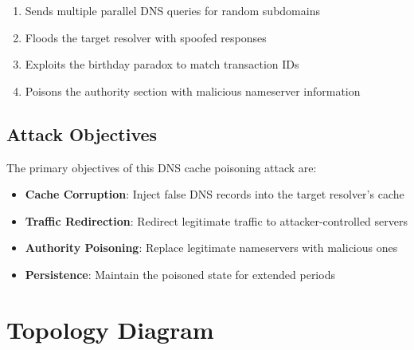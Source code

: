 \documentclass[12pt,a4paper]{article}
\begin{document}
\begin{enumerate}
    \item Sends multiple parallel DNS queries for random subdomains
    \item Floods the target resolver with spoofed responses
    \item Exploits the birthday paradox to match transaction IDs
    \item Poisons the authority section with malicious nameserver information
\end{enumerate}

\subsection{Attack Objectives}

The primary objectives of this DNS cache poisoning attack are:

\begin{itemize}
    \item \textbf{Cache Corruption}: Inject false DNS records into the target resolver's cache
    \item \textbf{Traffic Redirection}: Redirect legitimate traffic to attacker-controlled servers
    \item \textbf{Authority Poisoning}: Replace legitimate nameservers with malicious ones
    \item \textbf{Persistence}: Maintain the poisoned state for extended periods
\end{itemize}



\section{Topology Diagram}
\end{document}
